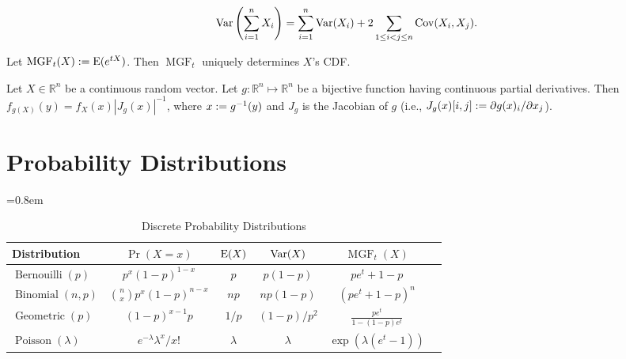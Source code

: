 \documentclass[a4paper, 12pt, fleqn]{article}
\DeclareMathOperator{\MGF}{MGF}
\DeclareMathOperator{\Cov}{Cov}
\begin{document}
\begin{theorem}
\[ \Var\left(\sum_{i=1}^n X_i\right) = \sum_{i=1}^n \Var(X_i) + 2\sum_{1 \le i < j \le n} \Cov(X_i, X_j). \]
\end{theorem}

\begin{theorem}
Let $\MGF_t(X) \defeq \E(e^{tX})$. Then $\MGF_t$ uniquely determines $X$'s CDF.
\end{theorem}

\begin{theorem}
Let $X \in \mathbb{R}^n$ be a continuous random vector.
Let $g: \mathbb{R}^n \mapsto \mathbb{R}^n$ be a bijective function
having continuous partial derivatives.
Then $f_{g(X)}(y) = f_X(x)|J_g(x)|^{-1}$, where $x := g^{-1}(y)$
and $J_g$ is the Jacobian of $g$
(i.e., $J_g(x)[i,j] := \partial g(x)_i/\partial x_j$).
\end{theorem}

\section{Probability Distributions}

\begin{table}[!ht]
\centering
\caption{Discrete Probability Distributions}
=0.8em
\abovetopsep=4pt
\begin{tabular}{lccccc}
\toprule Distribution
    & $\Pr(X = x)$
    & $\operatorname*{E}(X)$
    & $\operatorname*{Var}(X)$
    & $\MGF_t(X)$
\\ \midrule $\operatorname{Bernouilli}(p)$
    & $p^x(1-p)^{1-x}$
    & $p$
    & $p(1-p)$
    & $pe^t + 1-p$
\\[\defaultaddspace] $\operatorname{Binomial}(n, p)$
    & $\displaystyle \binom{n}{x}p^x(1-p)^{n-x}$
    & $np$
    & $np(1-p)$
    & $(pe^t + 1-p)^n$
\\[\defaultaddspace] $\operatorname{Geometric}(p)$
    & $(1-p)^{x-1}p$
    & $1/p$
    & $(1-p)/p^2$
    & $\displaystyle \frac{pe^t}{1-(1-p)e^t}$
\\[\defaultaddspace] $\operatorname{Poisson}(\lambda)$
    & $e^{-\lambda}\lambda^x/x!$
    & $\lambda$
    & $\lambda$
    & $\displaystyle \exp(\lambda(e^t-1))$
\\ \bottomrule
\end{tabular}
\label{table:disc-distr}
\end{table}
\end{document}
